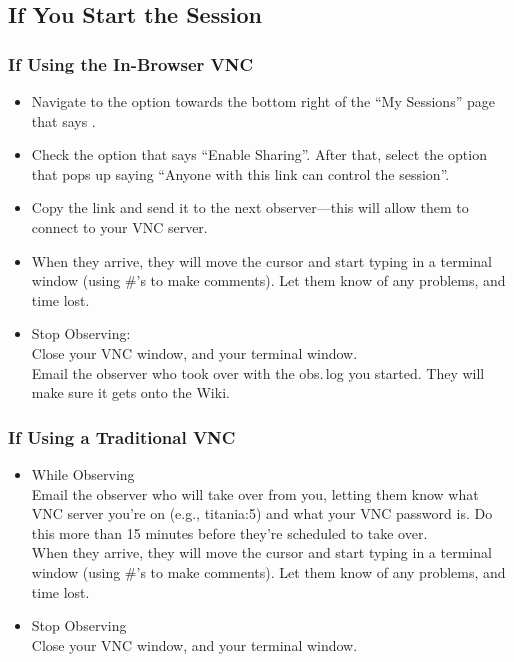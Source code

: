 \documentclass[11pt]{article}
\begin{document}
\subsection{If You Start the Session} %

 \subsubsection{If Using the In-Browser VNC} \begin{itemize} \label{sssec:hndoff}
  \item Navigate to the option towards the bottom right of the ``My Sessions'' page that says . 
  \item Check the option that says ``Enable Sharing''. After that, select the option that pops up saying ``Anyone with this link can control the session''. 
  \item Copy the link and send it to the next observer---this will allow them to connect to your VNC server.
  \item When they arrive, they will move the cursor and start typing in a terminal window (using \#'s to make comments).  Let them know of any problems, and time lost.  
  \item Stop Observing: \\
 Close your VNC window, and your terminal window.  \\
 Email the observer who took over with the obs.\,log you started.  They will make sure it gets onto the Wiki.  
  \end{itemize}

 \subsubsection{If Using a Traditional VNC} \begin{itemize}
 \item While Observing \\
 Email the observer who will take over from you, letting them know what VNC server you're on (e.g., titania:5) and what your VNC password is.  Do this more than 15 minutes before they're scheduled to take over.  \\
 When they arrive, they will move the cursor and start typing in a terminal window (using \#'s to make comments).  Let them know of any problems, and time lost.  

 \item Stop Observing \\
 Close your VNC window, and your terminal window.  
\end{itemize}
\end{document}
